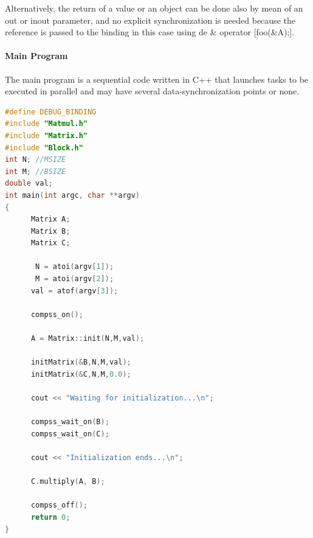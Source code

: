 Alternatively, the return of a value or an object can be done also by mean of an out or inout parameter, and no explicit synchronization is needed because the reference is passed to the binding in this case using de \& operator [foo(\&A);].

\paragraph{Main Program}
The main program is a sequential code written in C++ that launches tasks to be executed in parallel and may have several data-synchronization points or none.

\begin{lstlisting}[language=C++]
#define DEBUG_BINDING
#include "Matmul.h"
#include "Matrix.h"
#include "Block.h"
int N; //MSIZE
int M; //BSIZE
double val;
int main(int argc, char **argv)
{
      Matrix A;
      Matrix B;
      Matrix C;

       N = atoi(argv[1]);
       M = atoi(argv[2]);
      val = atof(argv[3]);

      compss_on();

      A = Matrix::init(N,M,val);

      initMatrix(&B,N,M,val);
      initMatrix(&C,N,M,0.0);

      cout << "Waiting for initialization...\n";

      compss_wait_on(B);
      compss_wait_on(C);

      cout << "Initialization ends...\n";
 
      C.multiply(A, B);

      compss_off();
      return 0;
}
\end{lstlisting}

